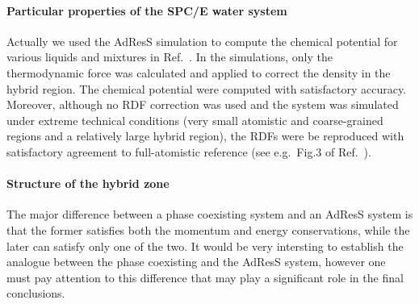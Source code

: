 \documentclass[epjST]{svjour}
\begin{document}
\paragraph{Particular properties of the SPC/E water system}
Actually we used the AdResS simulation to compute the chemical
potential for various liquids and mixtures in
Ref.~\cite{agarwal2014chemical}.  In the simulations, only the
thermodynamic force was calculated and applied to correct the density
in the hybrid region.  The chemical potential were computed with
satisfactory accuracy.  Moreover, although no RDF correction was used
and the system was simulated under extreme technical conditions (very
small atomistic and coarse-grained regions and a relatively large
hybrid region), the RDFs were be reproduced with satisfactory
agreement to full-atomistic reference (see e.g.~Fig.3 of Ref.~\cite{agarwal2014chemical}).

\paragraph{Structure of the hybrid zone}
The major difference between a phase coexisting system and an AdResS
system is that the former satisfies both the momentum and energy
conservations, while the later can satisfy only one of the two.
It would be very intersting to establish the analogue between
the phase coexisting and the AdResS system, however one must pay attention
to this difference that may play a significant role in the final conclusions.



{}


\end{document}
